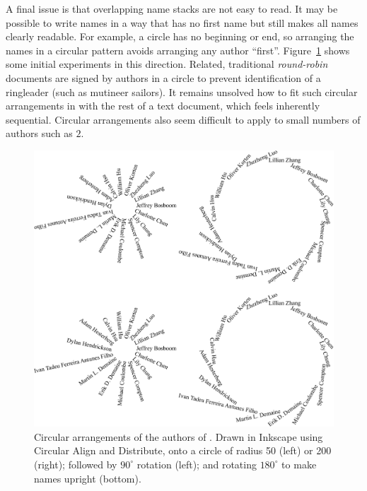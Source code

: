 \documentclass[natbib,authoryear]{sigtbd17-style}
\begin{document}
A final issue is that overlapping name stacks are not easy to read.
It may be possible to write names in a way that has no first name
but still makes all names clearly readable.
For example, a circle has no beginning or end, so arranging the names
in a circular pattern avoids arranging any author ``first''.
Figure~\ref{fig:circles} shows some initial experiments in this direction.
Related, traditional \emph{round-robin} documents \cite{round-robin}
are signed by authors in a circle to prevent identification of a ringleader
(such as mutineer sailors).
It remains unsolved how to fit such circular arrangements
in with the rest of a text document, which feels inherently sequential.
Circular arrangements also seem difficult to apply to small numbers of
authors such as $2$.

\begin{figure}
  \centering
  \includegraphics[width=\linewidth]{figs/circles}
  \caption{Circular arrangements of the authors of
    \citet{LessThanEdgeMatching_JIP}.  Drawn in Inkscape
    using Circular Align and Distribute, onto a circle of
    radius 50 (left) or 200 (right); followed by $90^\circ$ rotation
    (left); and rotating $180^\circ$ to make names upright (bottom).}
  \label{fig:circles}
\end{figure}


\end{document}

